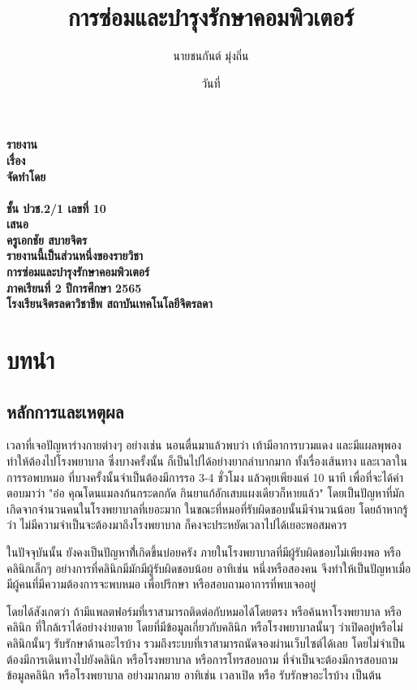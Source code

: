 \documentclass[12pt,a4paper]{report}
\title{การซ่อมและบำรุงรักษาคอมพิวเตอร์}
\author{นายชนกันต์ มุ่งถิ่น}
\date{วันที่}
\begin{document}
\begin{titlepage}
\begin{center}



{\Large \textbf{รายงาน}}\\[0.5cm]
{\Large \textbf{เรื่อง \thetitle}}\\[2cm]
{\Large \textbf{จัดทำโดย}}\\[0.5cm]
{\Large \textbf{\theauthor}}\\[0.2cm]
{\Large \textbf{ชั้น ปวช.2/1 เลขที่ 10}}\\[2cm]
{\Large \textbf{เสนอ}}\\[0.5cm]
{\Large \textbf{ครูเอกชัย สบายจิตร}}\\[1.8cm]
{\Large \textbf{รายงานนี้เป็นส่วนหนึ่งของรายวิชา\\[0.5cm] การซ่อมและบำรุงรักษาคอมพิวเตอร์}}\\[1cm]
{\Large \textbf{ภาคเรียนที่ 2 ปีการศึกษา 2565}}\\[0.5cm]
{\Large \textbf{โรงเรียนจิตรลดาวิชาชีพ สถาบันเทคโนโลยีจิตรลดา}}

\end{center}
\end{titlepage}


\chapter{บทนำ}

\section{หลักการและเหตุผล}
เวลาที่เจอปัญหาร่างกายต่างๆ อย่างเช่น นอนตื่นมาแล้วพบว่า เท้ามีอาการบวมแดง
และมีแผลพุพอง ทำให้ต้องไปโรงพยาบาล ซึ่งบางครั้งนั้น ก็เป็นไปได้อย่างยากลำบากมาก
ทั้งเรื่องเส้นทาง และเวลาในการรอพบหมอ ที่บางครั้งนั้นจำเป็นต้องมีการรอ 3-4 ชั่วโมง แล้วคุยเพียงแค่ 10 นาที เพื่อที่จะได้คำตอบมาว่า "อ๋อ คุณโดนแมลงก้นกระดกกัด กินยาแก้อักเสบแผงเดียวก็หายแล้ว" โดยเป็นปัญหาที่มักเกิดจากจำนวนคนในโรงพยาบาลที่เยอะมาก ในขณะที่หมอที่รับผิดชอบนั้นมีจำนวนน้อย
โดยถ้าหากรู้ว่า ไม่มีความจำเป็นจะต้องมาถึงโรงพยาบาล ก็คงจะประหยัดเวลาไปได้เยอะพอสมควร

ในปัจจุบันนั้น ยังคงเป็นปัญหาที่้เกิดขึ้นบ่อยครัง ภายในโรงพยาบาลที่มีผู้รับผิดชอบไม่เพียงพอ หรือคลินิกเล็กๆ อย่างการที่คลินิกมีมักมีผู้รับผิดชอบน้อย อาทิเช่น หนึ่งหรือสองคน จีงทำให้เป็นปัญหาเมื่อมีผู้คนที่มีความต้องการจะพบหมอ เพื่อปรึกษา หรือสอบถามอาการที่พบเจออยู่

โดยได้สังเกตว่า ถ้ามีแพลตฟอร์มที่เราสามารถติดต่อกับหมอได้โดยตรง หรือค้นหาโรงพยาบาล หรือคลินิก ที่ใกล้เราได้อย่างง่ายดาย โดยที่มีข้อมูลเกี่ยวกับคลินิก หรือโรงพยาบาลนั้นๆ ว่าเปิดอยู่หรือไม่ คลินิกนั้นๆ รับรักษาด้านอะไรบ้าง รวมถึงระบบที่เราสามารถนัดจองผ่านเว็บไซต์ได้เลย โดยไม่จำเป็นต้องมีการเดินทางไปยังคลินิก หรือโรงพยาบาล หรือการโทรสอบถาม ที่จำเป็นจะต้องมีการสอบถามข้อมูลคลินิก หรือโรงพยาบาล อย่างมากมาย อาทิเช่น เวลาเปิด หรือ รับรักษาอะไรบ้าง เป็นต้น
\end{document}
